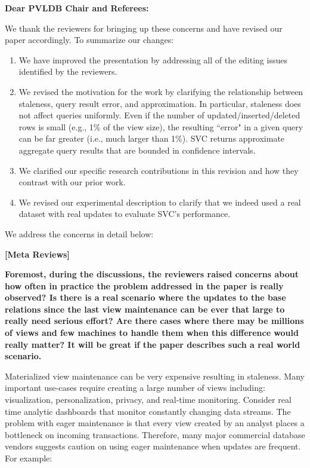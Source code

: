 {\noindent \normalsize \bf Dear PVLDB Chair and Referees: }

We thank the reviewers for bringing up these concerns and have revised our paper accordingly. To summarize our changes:
\begin{enumerate}[noitemsep]
\item We have improved the presentation by addressing all of the editing issues identified by the reviewers.
\item We revised the motivation for the work by clarifying the relationship between staleness, query result error, and approximation. In particular, staleness does not affect queries uniformly. Even if the number of updated/inserted/deleted rows is small (e.g., 1\% of the view size), the resulting ``error" in a given query can be far greater (i.e., much larger than 1\%). %
SVC returns approximate aggregate query results that are bounded in confidence intervals.
\item We clarified our specific research contributions in this revision and how they contrast with our prior work.
\item We revised our experimental description to clarify that we indeed used a real dataset with real updates to evaluate SVC's performance. 
\end{enumerate}

\vspace{1.5em}
We address the concerns in detail below: 

\noindent \textbf{[Meta Reviews]}

\vspace{0.5em}

\textbf{Foremost, during the discussions, the reviewers raised concerns about how often in practice the problem addressed in the paper is really observed? Is there is a real scenario where the updates to the base relations since the last view maintenance can be ever that large to really need serious effort? Are there cases where there may be millions of views and few machines to handle them when this difference would really matter? It will be great if the paper describes such a real world scenario.}

Materialized view maintenance can be very expensive resulting in staleness. Many important use-cases require creating a large number of views including: visualization, personalization, privacy, and real-time monitoring. 
 Consider real time analytic dashboards that monitor constantly changing data streams.  
The problem with eager maintenance is that every view created by an analyst places a bottleneck on incoming transactions.  Therefore, many major commercial database vendors suggests caution on using eager maintenance when updates are frequent. For example:

